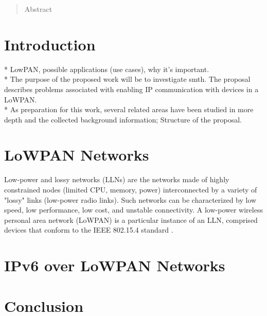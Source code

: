\documentclass[12pt, titlepage, a4paper]{report}
\begin{document}
\begin{titlepage}

\thispagestyle{empty}
\end{titlepage}

\newpage
\thispagestyle{empty}

\newpage
\begin{abstract}
Abstract
\end{abstract}

\newpage
\tableofcontents
\newpage 

\chapter{Introduction}
* LowPAN, possible applications (use cases), why it's important.\\
* The purpose of the proposed work will be to investigate smth. The proposal describes problems associated with enabling IP communication with devices in a LoWPAN.\\
* As preparation for this work, several related areas have been studied in more
depth and the collected background information; Structure of the proposal.\\

\chapter{LoWPAN Networks}
Low-power and lossy networks (LLNs) are the networks made of highly constrained nodes (limited CPU, memory, power) interconnected by a variety of "lossy" links (low-power radio links). Such networks can be characterized by low speed, low performance, low cost, and unstable connectivity.  A low-power wireless personal area network (LoWPAN) is a particular instance of an LLN, comprised devices that conform to the IEEE 802.15.4 standard \cite{ieee802.15.4}.

\chapter{IPv6 over LoWPAN Networks}

\chapter*{Conclusion}

\newpage



\nocite{ieee802.15.4} 
\nocite{rfc2460} 
\nocite{rfc4291} 
\nocite{rfc4443}
\nocite{rfc4861}
\nocite{rfc4862}
\nocite{rfc4919}
\nocite{rfc4944} 
\nocite{draft-usecases-05} 
\nocite{draft-hc-06} 
\nocite{draft-nd-06}
\end{document}
